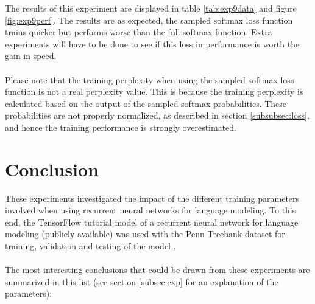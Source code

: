 \documentclass[10pt,a4paper,titlepage]{article}
\begin{document}
The results of this experiment are displayed in table \ref{tab:exp9data} and figure \ref{fig:exp9perf}. The results are as expected, the sampled softmax loss function trains quicker but performs worse than the full softmax function. Extra experiments will have to be done to see if this loss in performance is worth the gain in speed.\\
\\
Please note that the training perplexity when using the sampled softmax loss function is not a real perplexity value. This is because the training perplexity is calculated based on the output of the sampled softmax probabilities. These probabilities are not properly normalized, as described in section \ref{subsubsec:loss}, and hence the training performance is strongly overestimated.

\newpage

\section{Conclusion}

These experiments investigated the impact of the different training parameters involved when using recurrent neural networks for language modeling. To this end, the TensorFlow tutorial model of a recurrent neural network for language modeling (publicly available) was used with the Penn Treebank dataset for training, validation and testing of the model \cite{tensorflow}.\\
\\
The most interesting conclusions that could be drawn from these experiments are summarized in this list (see section \ref{subsec:exp} for an explanation of the parameters):
\end{document}
